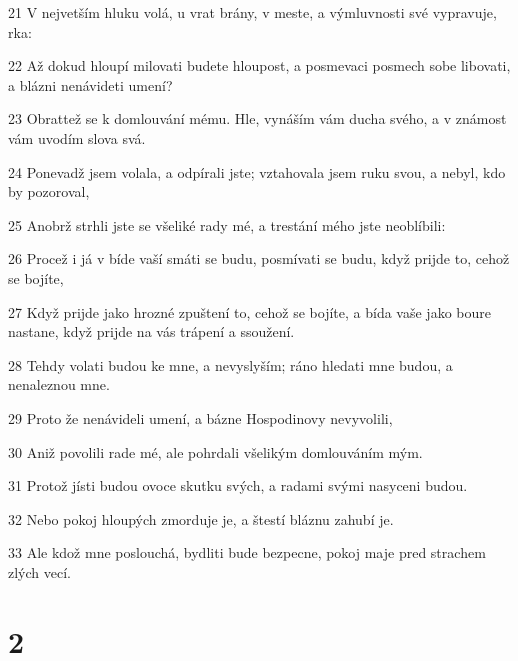 \par 21 V nejvetším hluku volá, u vrat brány, v meste, a výmluvnosti své vypravuje, rka:
\par 22 Až dokud hloupí milovati budete hloupost, a posmevaci posmech sobe libovati, a blázni nenávideti umení?
\par 23 Obrattež se k domlouvání mému. Hle, vynáším vám ducha svého, a v známost vám uvodím slova svá.
\par 24 Ponevadž jsem volala, a odpírali jste; vztahovala jsem ruku svou, a nebyl, kdo by pozoroval,
\par 25 Anobrž strhli jste se všeliké rady mé, a trestání mého jste neoblíbili:
\par 26 Procež i já v bíde vaší smáti se budu, posmívati se budu, když prijde to, cehož se bojíte,
\par 27 Když prijde jako hrozné zpuštení to, cehož se bojíte, a bída vaše jako boure nastane, když prijde na vás trápení a ssoužení.
\par 28 Tehdy volati budou ke mne, a nevyslyším; ráno hledati mne budou, a nenaleznou mne.
\par 29 Proto že nenávideli umení, a bázne Hospodinovy nevyvolili,
\par 30 Aniž povolili rade mé, ale pohrdali všelikým domlouváním mým.
\par 31 Protož jísti budou ovoce skutku svých, a radami svými nasyceni budou.
\par 32 Nebo pokoj hloupých zmorduje je, a štestí bláznu zahubí je.
\par 33 Ale kdož mne poslouchá, bydliti bude bezpecne, pokoj maje pred strachem zlých vecí.

\chapter{2}

